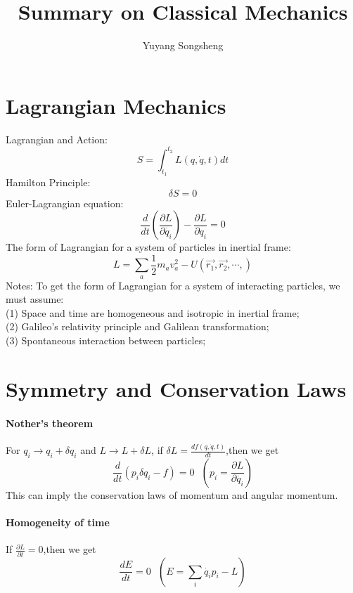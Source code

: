 \documentclass{article}
\author{Yuyang Songsheng}
\title{Summary on Classical Mechanics}
\begin{document}
\maketitle
\section{Lagrangian Mechanics}
Lagrangian and Action:
\begin{equation}
S=\int_{t_1}^{t_2}L(q,\dot{q},t)dt
\end{equation}
Hamilton Principle:
\begin{equation}
\delta S=0
\end{equation}
Euler-Lagrangian equation:
\begin{equation}
\frac{d}{dt}(\frac{\partial L}{\partial \dot{q_i}}) - \frac{\partial L}{\partial q_i}=0
\end{equation}
The form of Lagrangian for a system of particles in inertial frame:
\begin{equation}
L=\sum_a \frac{1}{2}m_a v_a^2 -U(\vec{r_1},\vec{r_2},\cdots,)
\end{equation}
Notes: To get the form of Lagrangian for a system of interacting particles, we must assume:\\
(1) Space and time are homogeneous and isotropic in inertial frame;\\
(2) Galileo's relativity principle and Galilean transformation;\\
(3) Spontaneous interaction between particles;\\

\section{Symmetry and Conservation Laws}
\paragraph{Nother's theorem}
For $q_i \to q_i+\delta q_i$ and $L \to L+\delta L$, if $\delta L= \frac{d f(q,\dot{q},t)}{dt}$,then we get
\begin{equation}
\frac{d}{dt}(p_i \delta q_i-f)=0 \ \ \ (p_i=\frac{\partial L}{\partial \dot{q_i}})
\end{equation}
This can imply the conservation laws of momentum and angular momentum.
\paragraph{Homogeneity of time}
If $\frac{\partial L}{\partial t}=0$,then we get
\begin{equation}
\frac{dE}{dt}=0 \ \ \ (E=\sum_i \dot{q_i}p_i-L)
\end{equation}
\end{document}
